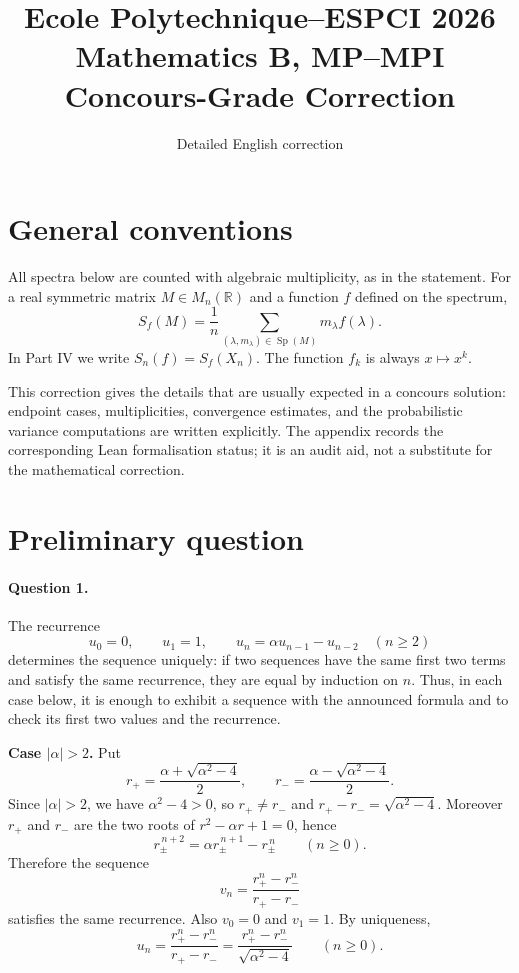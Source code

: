 \documentclass[11pt,a4paper]{article}
\title{Ecole Polytechnique--ESPCI 2026\\Mathematics B, MP--MPI\\Concours-Grade Correction}
\author{Detailed English correction}
\date{}
\newcommand{\R}{\mathbb{R}}
\DeclareMathOperator{\Sp}{Sp}
\begin{document}
\maketitle
\tableofcontents
\newpage

\section*{General conventions}
All spectra below are counted with algebraic multiplicity, as in the statement.  For a real symmetric matrix $M\in M_n(\R)$ and a function $f$ defined on the spectrum,
\[
  S_f(M)=\frac1n\sum_{(\lambda,m_\lambda)\in\Sp(M)}m_\lambda f(\lambda).
\]
In Part IV we write $S_n(f)=S_f(X_n)$.  The function $f_k$ is always $x\mapsto x^k$.

\bigskip
This correction gives the details that are usually expected in a concours solution: endpoint cases, multiplicities, convergence estimates, and the probabilistic variance computations are written explicitly.
The appendix records the corresponding Lean formalisation status; it is an
audit aid, not a substitute for the mathematical correction.

\section{Preliminary question}

\paragraph{Question 1.}
The recurrence
\[
  u_0=0,\qquad u_1=1,\qquad u_n=\alpha u_{n-1}-u_{n-2}\quad(n\ge2)
\]
determines the sequence uniquely: if two sequences have the same first two
terms and satisfy the same recurrence, they are equal by induction on $n$.
Thus, in each case below, it is enough to exhibit a sequence with the announced
formula and to check its first two values and the recurrence.

\medskip
\noindent\textbf{Case $|\alpha|>2$.}  Put
\[
  r_+=\frac{\alpha+\sqrt{\alpha^2-4}}2,\qquad
  r_-=\frac{\alpha-\sqrt{\alpha^2-4}}2.
\]
Since $|\alpha|>2$, we have $\alpha^2-4>0$, so $r_+\ne r_-$ and
$r_+-r_-=\sqrt{\alpha^2-4}$.  Moreover $r_+$ and $r_-$ are the two roots of
$r^2-\alpha r+1=0$, hence
\[
  r_\pm^{\,n+2}=\alpha r_\pm^{\,n+1}-r_\pm^{\,n}\qquad(n\ge0).
\]
Therefore the sequence
\[
  v_n=\frac{r_+^n-r_-^n}{r_+-r_-}
\]
satisfies the same recurrence.  Also $v_0=0$ and $v_1=1$.  By uniqueness,
\[
  \boxed{u_n=\frac{r_+^n-r_-^n}{r_+-r_-}
  =\frac{r_+^n-r_-^n}{\sqrt{\alpha^2-4}}\qquad(n\ge0).}
\]
\end{document}

